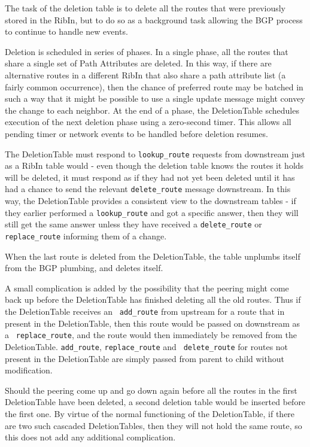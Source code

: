 \documentclass[11pt]{article}
\begin{document}
The task of the deletion table is to delete all the routes that were
previously stored in the RibIn, but to do so as a background task
allowing the BGP process to continue to handle new events.

Deletion is scheduled in series of phases.  In a single phase, all the
routes that share a single set of Path Attributes are deleted.  In
this way, if there are alternative routes in a different RibIn that
also share a path attribute list (a fairly common occurrence), then the
chance of preferred route may be batched in such a way that it might be
possible to use a single update message might convey the change to
each neighbor.  At the end of a phase, the DeletionTable schedules
execution of the next deletion phase using a zero-second timer.  This
allows all pending timer or network events to be handled before
deletion resumes.

The DeletionTable must respond to {\tt lookup\_route} requests from
downstream just as a RibIn table would - even though the deletion
table knows the routes it holds will be deleted, it must respond as if
they had not yet been deleted until it has had a chance to send the
relevant {\tt delete\_route} message downstream.  In this way, the
DeletionTable provides a consistent view to the downstream tables - if
they earlier performed a {\tt lookup\_route} and got a specific answer,
then they will still get the same answer unless they have received a
{\tt delete\_route} or {\tt replace\_route} informing them of a
change.

When the last route is deleted from the DeletionTable, the table
unplumbs itself from the BGP plumbing, and deletes itself.

A small complication is added by the possibility that the peering
might come back up before the DeletionTable has finished deleting all
the old routes.  Thus if the DeletionTable receives an {\tt
add\_route} from upstream for a route that in present in the
DeletionTable, then this route would be passed on downstream as a {\tt
replace\_route}, and the route would then immediately be removed from
the DeletionTable.  {\tt add\_route}, {\tt replace\_route} and {\tt
delete\_route} for routes not present in the DeletionTable are simply
passed from parent to child without modification.

Should the peering come up and go down again before all the routes in
the first DeletionTable have been deleted, a second deletion table
would be inserted before the first one.  By virtue of the normal
functioning of the DeletionTable, if there are two such cascaded
DeletionTables, then they will not hold the same route, so this does
not add any additional complication.
\end{document}
